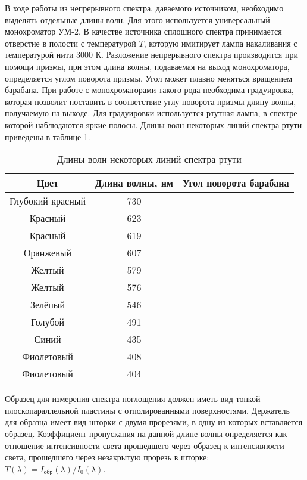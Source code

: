 В ходе работы из непрерывного спектра, даваемого источником, необходимо выделять отдельные длины волн. Для этого используется универсальный монохроматор УМ-2. В качестве источника сплошного спектра принимается отверстие в полости с температурой $T$, которую имитирует лампа накаливания с температурой нити 3000 К. Разложение непрерывного спектра производится при помощи призмы, при этом длина волны, подаваемая на выход монохроматора, определяется углом поворота призмы. Угол может плавно меняться вращением барабана. При работе с монохроматорами такого рода необходима градуировка, которая позволит поставить в соответствие углу поворота призмы длину волны, получаемую на выходе. Для градуировки используется ртутная лампа, в спектре которой наблюдаются яркие полосы. Длины волн некоторых линий спектра ртути приведены в таблице \ref{table6_Hg}.

\begin{table}[h]
\caption{Длины волн некоторых линий спектра ртути}
\begin{center}
\begin{tabular}{c|c|c}
Цвет & Длина волны, нм & Угол поворота барабана \\
\hline
Глубокий красный & 730 & \\
Красный & 623 & \\
Красный & 619 & \\
Оранжевый & 607 & \\
Желтый & 579 & \\
Желтый & 576 & \\
Зелёный & 546 & \\
Голубой & 491 & \\
Синий & 435 & \\
Фиолетовый & 408 & \\
Фиолетовый & 404 & \\
\hline
\end{tabular}
\end{center}
\label{table6_Hg}
\end{table}

Образец для измерения спектра поглощения должен иметь вид тонкой плоскопараллельной пластины с отполированными поверхностями. Держатель для образца имеет вид шторки с двумя прорезями, в одну из которых вставляется образец. Коэффициент пропускания на данной длине волны определяется как отношение интенсивности света прошедшего через образец к интенсивности света, прошедшего через незакрытую прорезь в шторке: $T(\lambda) = I_{\text{обр}}(\lambda)/I_{\text{0}}(\lambda)$.

